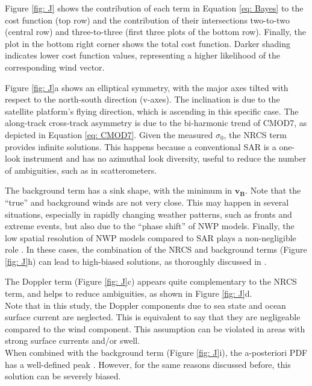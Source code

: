 Figure \ref{fig: J} shows the contribution of each term in Equation \ref{eq:
Bayes} to the cost function (top row) and the contribution of their
intersections two-to-two (central row) and three-to-three (first three plots of
the bottom row). Finally, the plot in the bottom right corner shows the total
cost function. Darker shading indicates lower cost function values,
representing a higher likelihood of the corresponding wind vector.

Figure \ref{fig: J}a shows an elliptical symmetry, with the major axes tilted
with respect to the north-south direction (v-axes). The inclination is due to
the satellite platform's flying direction, which is ascending in this specific
case. The along-track cross-track asymmetry is due to the bi-harmonic trend of
CMOD7, as depicted in Equation \ref{eq: CMOD7}. Given the measured
$\sigma_{0}$, the \ac{NRCS} term provides infinite solutions. This happens
because a conventional \ac{SAR} is a one-look instrument and has no azimuthal
look diversity, useful to reduce the number of ambiguities, such as in
scatterometers.

The background term has a sink shape, with the minimum in $\mathbf{v_{B}}$.
Note that the ``true'' and background winds are not very close. This may happen
in several situations, especially in rapidly changing weather patterns, such as
fronts and extreme events, but also due to the ``phase shift'' of \ac{NWP} models.
Finally, the low spatial resolution of \ac{NWP} models compared to \ac{SAR} plays a
non-negligible role \cite{VogelzangJGRO2011}. In these cases, the combination
of the \ac{NRCS} and background terms (Figure \ref{fig: J}h) can lead to
high-biased solutions, as thoroughly discussed in \cite{PortabellaJGRO2002}.

The Doppler term (Figure \ref{fig: J}c) appears quite complementary to the
\ac{NRCS} term, and helps to reduce ambiguities, as shown in Figure \ref{fig:
J}d. \\
Note that in this study, the Doppler components due to sea state and ocean surface current are neglected. This is equivalent to say that they are negligeable compared to the wind component. This assumption can be violated in areas with strong surface currents and/or swell. \\
When combined with the background term (Figure \ref{fig: J}i), the
a-posteriori \ac{PDF} has a well-defined peak \cite{MoucheTGRS2012}. However,
for the same reasons discussed before, this solution can be severely biased.

